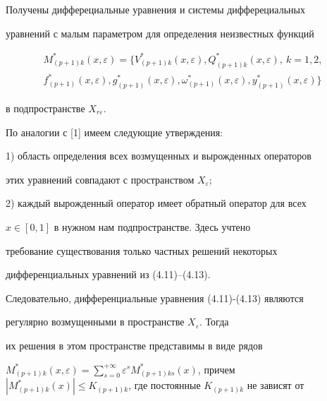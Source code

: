Получены дифферециальные уравнения и системы дифферециальных


уравнений с малым параметром для определения неизвестных функций


\begin{multline*}


M_{(p+1)k} ^* (x, \varepsilon) = \bigl \{ V_{(p+1)k} ^* (x,


\varepsilon), Q_{(p+1)k} ^* (x, \varepsilon),\ k =1,2,\\


f_{(p+1)} ^* (x, \varepsilon), g_{(p+1)} ^* (x, \varepsilon), 


\omega_{(p+1)} ^* (x, \varepsilon), y_{(p+1)} ^* (x,


\varepsilon) \bigr \}


\end{multline*}


в подпространстве $X_{r \varepsilon}$.





По аналогии с [1] имеем следующие утверждения:





1) область определения всех возмущенных и вырожденных операторов


этих уравнений совпадают с пространством $ X_{\varepsilon}$;





2) каждый вырожденный оператор имеет обратный оператор для всех


$x \in [0,1]$ в нужном нам подпространстве. Здесь учтено


требование существования только частных решений некоторых


дифференциальных уравнений из (4.11)--(4.13).





Следовательно, дифференциальные уравнения (4.11)-(4.13) являются


регулярно возмущенными в пространстве $X_{\varepsilon}$. Тогда


их решения в этом пространстве представимы в виде рядов


$M_{(p+1)k} ^* (x, \varepsilon) = \sum\limits_{s=0}^{ +\infty}


\varepsilon^s M_{(p+1)k s} ^* (x)$, причем $ |M_{(p+1)k} ^*


(x)| \leq K_{(p+1)k}$, где постоянные $K_{(p+1)k}$ не зависят от



